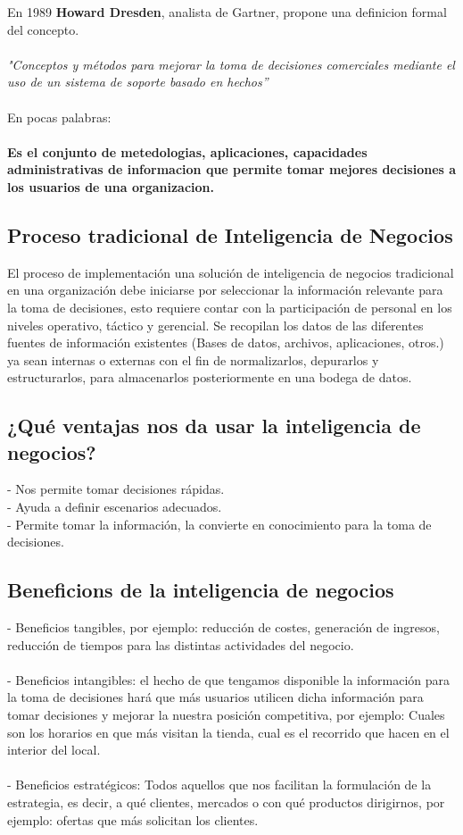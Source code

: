 \documentclass[twoside,twocolumn]{article}
\begin{document}
En 1989 \textbf{Howard Dresden}, analista de Gartner, propone una definicion formal del concepto.
\\ \\
\textsl{"Conceptos y métodos para mejorar la toma de decisiones comerciales mediante el uso de un sistema de soporte basado en hechos''}
\\ \\
En pocas palabras: \\ \\
\textbf{Es el conjunto de metedologias, aplicaciones, capacidades administrativas de informacion que permite tomar mejores decisiones a los usuarios de una organizacion.}


\subsection{Proceso tradicional de Inteligencia de Negocios}

El proceso de implementación una solución de inteligencia de
negocios tradicional en una organización debe iniciarse por
seleccionar la información relevante para la toma de decisiones,
esto requiere contar con la participación de personal en los niveles
operativo, táctico y gerencial. Se recopilan los datos de las
diferentes fuentes de información existentes (Bases de datos,
archivos, aplicaciones, otros.) ya sean internas o externas con el fin
de normalizarlos, depurarlos y estructurarlos, para almacenarlos
posteriormente en una bodega de datos.

\subsection{¿Qué ventajas nos da usar la inteligencia de negocios?}

- Nos permite tomar decisiones rápidas. \\
- Ayuda a definir escenarios adecuados. \\
- Permite tomar la información, la convierte en conocimiento para la toma de decisiones. \\
\subsection{Beneficions de la inteligencia de negocios}

- Beneficios tangibles, por ejemplo: reducción de costes, generación de ingresos, reducción de tiempos para las distintas actividades del negocio. \\\\
- Beneficios intangibles: el hecho de que tengamos disponible la información para la toma de decisiones hará que más usuarios utilicen dicha información para tomar decisiones y mejorar la nuestra posición competitiva, por ejemplo: Cuales son los horarios en que más visitan la tienda, cual es el recorrido que hacen en el interior del local. \\\\
- Beneficios estratégicos: Todos aquellos que nos facilitan la formulación de la estrategia, es decir, a qué clientes, mercados o con qué productos dirigirnos, por ejemplo: ofertas que más solicitan los clientes.
\end{document}
